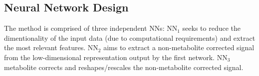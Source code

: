     \vspace{-0.5cm}
    
    \subsection{Neural Network Design}\label{sec:NNDesign}
        The method is comprised of three independent \glspl{NN}: \gls{NN}$_1$ seeks to reduce the dimentionality of the input data (due to computational requirements) and extract the most relevant features. \gls{NN}$_2$ aims to extract a non-metabolite corrected signal from the low-dimensional representation output by the first network. \gls{NN}$_3$ metabolite corrects and reshapes/rescales the non-metabolite corrected signal. 
        


